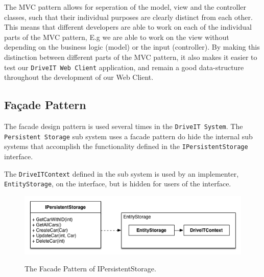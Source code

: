 The MVC pattern allows for seperation of the model, view and the controller classes, such that their individual purposes are clearly distinct from each other. This means that different developers are able to work on each of the individual parts of the MVC pattern, E.g we are able to work on the view without depending on the business logic (model) or the input (controller). By making this distinction between different parts of the MVC pattern, it also makes it easier to test our \texttt{DriveIT Web Client} application, and remain a good data-structure throughout the development of our Web Client.


\subsection{Façade Pattern}
The facade design pattern is used several times in the \texttt{DriveIT System}.
The \texttt{Persistent Storage} sub system uses a facade pattern do hide the internal sub systems that accomplish the functionality defined in the \texttt{IPersistentStorage} interface.

The \texttt{DriveITContext} defined in the sub system is used by an implementer, \texttt{EntityStorage}, on the interface, but is hidden for users of the interface. 

\begin{figure}[H]
	\centering
	\includegraphics[scale=0.6]{Figures/FacadePatternPersistentStorage}\\
	\caption{The Facade Pattern of IPersistentStorage.}
	\label{fig:The Facade Pattern of IPersistentStorage.}
\end{figure}

